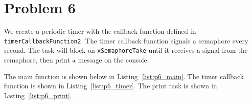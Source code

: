 \section*{Problem 6}
We create a periodic timer with the callback function defined in \texttt{timerCallbackFunction2}. The timer callback function signals a semaphore every second. The task will block on \texttt{xSemaphoreTake} until it receives a signal from the semaphore, then print a message on the console.

The main function is shown below in Listing~\ref{list:p6_main}. The timer callback function is shown in Listing~\ref{list:p6_timer}. The print task is shown in Listing~\ref{list:p6_print}.





